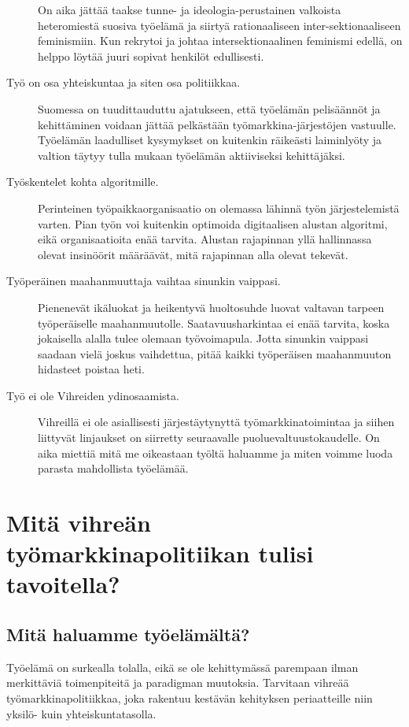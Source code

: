 \documentclass[nobib,finnish,oneside,openany,notoc,a4paper]{tufte-book}
\begin{document}
\begin{description}
    On aika jättää taakse tunne- ja ideologia-perustainen valkoista heteromiestä suosiva työelämä ja siirtyä rationaaliseen inter-sektionaaliseen feminismiin. Kun rekrytoi ja johtaa intersektionaalinen feminismi edellä, on helppo löytää juuri sopivat henkilöt edullisesti.
    \item[Työ on osa yhteiskuntaa ja siten osa politiikkaa.] Suomessa on tuudittauduttu ajatukseen, että työelämän pelisäännöt ja kehittäminen voidaan jättää pelkästään työmarkkina-järjestöjen vastuulle. Työelämän laadulliset kysymykset on kuitenkin räikeästi laiminlyöty ja valtion täytyy tulla mukaan työelämän aktiiviseksi kehittäjäksi.
    \item[Työskentelet kohta algoritmille.] Perinteinen työpaikkaorganisaatio on olemassa lähinnä työn järjestelemistä varten. Pian työn voi kuitenkin optimoida digitaalisen alustan algoritmi, eikä organisaatioita enää tarvita. Alustan rajapinnan yllä hallinnassa olevat insinöörit määräävät, mitä rajapinnan alla olevat tekevät.
    \item[Työperäinen maahanmuuttaja vaihtaa sinunkin vaippasi.] Pienenevät ikäluokat ja heikentyvä huoltosuhde luovat valtavan tarpeen työperäiselle maahanmuutolle. Saatavuusharkintaa ei enää tarvita, koska jokaisella alalla tulee olemaan työvoimapula. Jotta sinunkin vaippasi saadaan vielä joskus vaihdettua, pitää kaikki työperäisen maahanmuuton hidasteet poistaa heti.
    \item[Työ ei ole Vihreiden ydinosaamista.] Vihreillä ei ole asiallisesti järjestäytynyttä työmarkkinatoimintaa ja siihen liittyvät linjaukset on siirretty seuraavalle puoluevaltuustokaudelle. On aika miettiä mitä me oikeastaan työltä haluamme ja miten voimme luoda parasta mahdollista työelämää. 
\end{description}

\part{Mitä vihreän työmarkkinapolitiikan tulisi tavoitella?}

\chapter{Mitä haluamme työelämältä?}

Työelämä on surkealla tolalla, eikä se ole kehittymässä parempaan ilman merkittäviä toimenpiteitä ja paradigman muutoksia. Tarvitaan vihreää työmarkkinapolitiikkaa, joka rakentuu kestävän kehityksen periaatteille niin yksilö- kuin yhteiskuntatasolla. 
\end{document}
